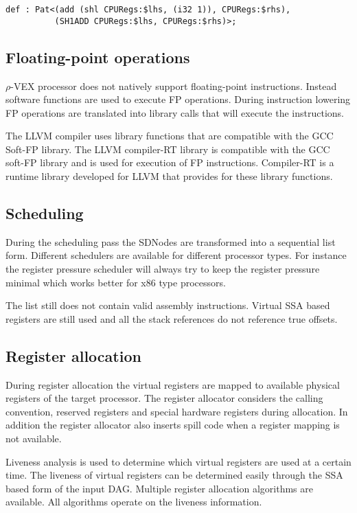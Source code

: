 \begin{lstlisting}
def : Pat<(add (shl CPURegs:$lhs, (i32 1)), CPURegs:$rhs),
          (SH1ADD CPURegs:$lhs, CPURegs:$rhs)>;
\end{lstlisting}

\subsection{Floating-point operations}
$\rho$-VEX processor does not natively support floating-point instructions. Instead software functions are used to execute FP operations. During instruction lowering FP operations are translated into library calls that will execute the instructions.

The LLVM compiler uses library functions that are compatible with the GCC Soft-FP library. The LLVM compiler-RT library is compatible with the GCC soft-FP library and is used for execution of FP instructions. Compiler-RT is a runtime library developed for LLVM that provides for these library functions.

\subsection{Scheduling}
During the scheduling pass the SDNodes are transformed into a sequential list form. Different schedulers are available for different processor types. For instance the register pressure scheduler will always try to keep the register pressure minimal which works better for x86 type processors.

The list still does not contain valid assembly instructions. Virtual SSA based registers are still used and all the stack references do not reference true offsets.

\subsection{Register allocation}
During register allocation the virtual registers are mapped to available physical registers of the target processor. The register allocator considers the calling convention, reserved registers and special hardware registers during allocation. In addition the register allocator also inserts spill code when a register mapping is not available.

Liveness analysis is used to determine which virtual registers are used at a certain time. The liveness of virtual registers can be determined easily through the SSA based form of the input DAG. Multiple register allocation algorithms are available. All algorithms operate on the liveness information.

